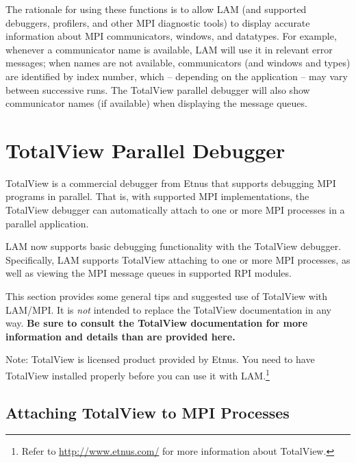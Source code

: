 The rationale for using these functions is to allow LAM (and supported
debuggers, profilers, and other MPI diagnostic tools) to display
accurate information about MPI communicators, windows, and datatypes.
For example, whenever a communicator name is available, LAM will use
it in relevant error messages; when names are not available,
communicators (and windows and types) are identified by index number,
which -- depending on the application -- may vary between successive
runs.  The TotalView parallel debugger will also show communicator
names (if available) when displaying the message queues.


\section{TotalView Parallel Debugger}
\label{sec:debug-totalview}

TotalView is a commercial debugger from Etnus that supports debugging
MPI programs in parallel.  That is, with supported MPI
implementations, the TotalView debugger can automatically attach to
one or more MPI processes in a parallel application.

LAM now supports basic debugging functionality with the TotalView
debugger.  Specifically, LAM supports TotalView attaching to one or
more MPI processes, as well as viewing the MPI message queues in
supported RPI modules.

This section provides some general tips and suggested use of TotalView
with LAM/MPI.  It is {\em not} intended to replace the TotalView
documentation in any way.  {\bf Be sure to consult the TotalView
  documentation for more information and details than are provided
  here.}

Note: TotalView is licensed product provided by Etnus. You need to
have TotalView installed properly before you can use it with
LAM.\footnote{Refer to \url{http://www.etnus.com/} for more
  information about TotalView.}


\subsection{Attaching TotalView to MPI Processes}

